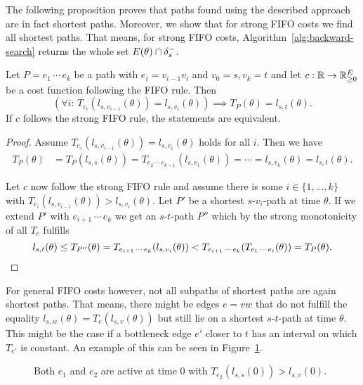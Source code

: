 The following proposition proves that paths found using the described approach are in fact shortest paths.
Moreover, we show that for strong FIFO costs we find all shortest paths.
That means, for strong FIFO costs, Algorithm~\ref{alg:backward-search} returns the whole set $E(\theta)\cap\delta^-_{s}$.

\begin{proposition}
    Let $P=e_1\,\cdots\,e_k$ be a path with $e_i = v_{i-1}v_{i}$ and $v_0 = s, v_k= t$ and let $c:\mathbb{R}\rightarrow\mathbb{R}^E_{\geq0}$ be a cost function following the FIFO rule. Then
    \[ 
        \left(\forall i:\, {T_{e_i}}{\left(l_{s,v_{i-1}}(\theta)\right)} = l_{s,v_i}(\theta)\right)
        \implies
        T_P(\theta) = l_{s,t}(\theta).
    \]
    If $c$ follows the strong FIFO rule, the statements are equivalent.
\end{proposition}

\begin{proof}
    Assume $T_{e_i}(l_{s,v_{i-1}}(\theta)) = l_{s,v_i}(\theta)$ holds for all $i$.
    Then we have \begin{align*}
        T_P(\theta)
        &= T_P(l_{s,s}(\theta))
        = T_{e_2\,\cdots\,e_{k-1}}(l_{s,v_1}(\theta))
        = \cdots
        = l_{s,v_k}(\theta) = l_{s,t}(\theta).
    \end{align*}

    Let $c$ now follow the strong FIFO rule and assume there is some $i\in\{1,\dots, k\}$ with $T_{e_i}(l_{s,v_{i-1}}(\theta)) > l_{s,v_i}(\theta)$.
    Let $P'$ be a shortest $s$-$v_i$-path at time $\theta$.
    If we extend $P'$ with $e_{i+1}\,\cdots\,e_{k}$ we get an $s$-$t$-path $P''$ which 
    by the strong monotonicity of all $T_e$ fulfills \[
        l_{s,t}(\theta) \leq T_{P''}(\theta)
        = T_{e_{i+1}\,\cdots\,e_k}(l_{s,v_{i}}(\theta))
        < T_{e_{i+1}\,\cdots\,e_k}(T_{e_1\,\cdots\,e_i}(\theta))
        = T_P(\theta).\qedhere
    \]
\end{proof}

For general FIFO costs however, not all subpaths of shortest paths are again shortest paths.
That means, there might be edges $e=vw$ that do not fulfill the equality $l_{s,w}(\theta) = T_e(l_{s,v}(\theta))$ but still lie on a shortest $s$-$t$-path at time $\theta$.
This might be the case if a bottleneck edge $e'$ closer to $t$ has an interval on which $T_{e'}$ is constant.
An example of this can be seen in Figure~\ref{fig:bottleneck}.

\begin{figure}
    \centering
    \caption{Both $e_1$ and $e_2$ are active at time $0$ with $T_{e_2}(l_{s,s}(0))> l_{s,v}(0)$.}\label{fig:bottleneck}
\end{figure}

